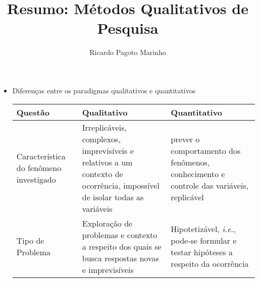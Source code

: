 \documentclass[11pt,a4paper]{book}
\title{Resumo: Métodos Qualitativos de Pesquisa}
\author{Ricardo Pagoto Marinho}
\begin{document}
\maketitle
	\begin{itemize}
		\item Diferenças entre os paradigmas qualitativos e quantitativos
		
		\begin{tabular}{|p{3cm}|p{4cm}|p{4cm}|}
		\hline
		Questão & Qualitativo & Quantitativo\\ \hline
		Característica do fenômeno investigado & Irreplicáveis, complexos, imprevisíveis e relativos a um contexto de ocorrência, impossível de isolar todas as variáveis & prever o comportamento dos fenômenos, conhecimento e controle das variáveis, replicável\\ \hline
		Tipo de Problema & Exploração de problemas e contexto a respeito dos quais se busca respostas novas e imprevisíveis & Hipotetizável, \textit{i.e.}, pode-se formular e testar hipóteses a respeito da ocorrência\\ \hline
		\end{tabular}
	\end{itemize}
\end{document}
